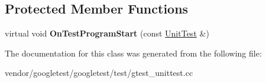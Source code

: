 \subsection*{Protected Member Functions}
\begin{DoxyCompactItemize}
\item 
\mbox{\label{class_test_listener_a6218f522f5b6b37050ff0ea630ac5fd3}} 
virtual void {\bfseries On\+Test\+Program\+Start} (const \hyperlink{classtesting_1_1_unit_test}{Unit\+Test} \&)
\end{DoxyCompactItemize}


The documentation for this class was generated from the following file\+:\begin{DoxyCompactItemize}
\item 
vendor/googletest/googletest/test/gtest\+\_\+unittest.\+cc\end{DoxyCompactItemize}
